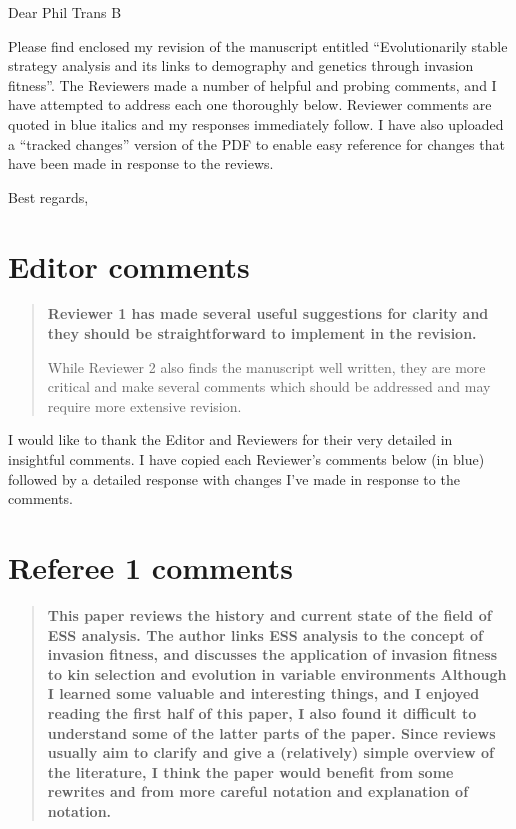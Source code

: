 \documentclass[10pt,parskip=full,foldmarks=off,addrfield=off,backaddress=false,refline=dateleft,letterpaper]{scrlttr2}
\newenvironment{reviewerquote}{\begin{quote}\color{DarkBlue}\bfseries}{\end{quote}}
\begin{document}
\begin{letter}

  \opening{Dear Phil Trans B}

  Please find enclosed my revision of the manuscript entitled ``Evolutionarily stable strategy analysis and its links to demography and genetics through invasion fitness''. The Reviewers made a number of helpful and probing comments, and I have attempted to address each one thoroughly below. Reviewer comments are quoted in blue italics and my responses immediately follow. I have also uploaded a ``tracked changes'' version of the PDF to enable easy reference for changes that have been made in response to the reviews.

  \closing{Best regards,}

\section{Editor comments}

\begin{reviewerquote}
  Reviewer 1 has made several useful suggestions for clarity and they should be straightforward to implement in the revision.

  While Reviewer 2 also finds the manuscript well written, they are more critical and make several comments which should be addressed and may require more extensive revision.
\end{reviewerquote}

I would like to thank the Editor and Reviewers for their very detailed in insightful comments. I have copied each Reviewer's comments below (in blue) followed by a detailed response with changes I've made in response to the comments.

\section{Referee 1 comments}

\begin{reviewerquote}
  This paper reviews the history and current state of the field of ESS analysis. The author links ESS analysis to the concept of invasion fitness, and discusses the application of invasion fitness to kin selection and evolution in variable environments Although I learned some valuable and interesting things, and I enjoyed reading the first half of this paper, I also found it difficult to understand some of the latter parts of the paper. Since reviews usually aim to clarify and give a (relatively) simple overview of the literature, I think the paper would benefit from some rewrites and from more careful notation and explanation of notation.
\end{reviewerquote}


\end{letter}
\end{document}
